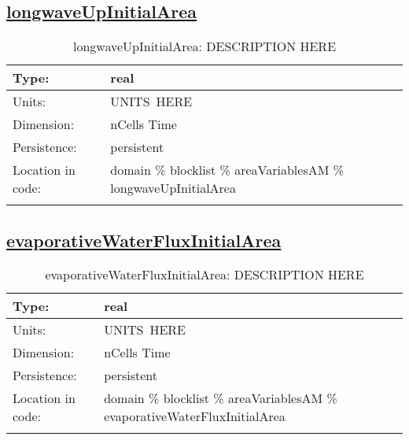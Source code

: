 \subsection[longwaveUpInitialArea]{\hyperref[sec:var_tab_areaVariablesAM]{longwaveUpInitialArea}}
\label{subsec:var_sec_areaVariablesAM_longwaveUpInitialArea}
\begin{center}
\begin{longtable}{| p{2.0in} | p{4.0in} |}
        \hline 
        Type: & real \\
        \hline 
        Units: & \si{UNITS.HERE} \\
        \hline 
        Dimension: & nCells Time \\
        \hline 
        Persistence: & persistent \\
        \hline 
         Location in code: & domain \% blocklist \% areaVariablesAM \% longwaveUpInitialArea \\
         \hline 
    \caption{longwaveUpInitialArea: DESCRIPTION HERE}
\end{longtable}
\end{center}
\subsection[evaporativeWaterFluxInitialArea]{\hyperref[sec:var_tab_areaVariablesAM]{evaporativeWaterFluxInitialArea}}
\label{subsec:var_sec_areaVariablesAM_evaporativeWaterFluxInitialArea}
\begin{center}
\begin{longtable}{| p{2.0in} | p{4.0in} |}
        \hline 
        Type: & real \\
        \hline 
        Units: & \si{UNITS.HERE} \\
        \hline 
        Dimension: & nCells Time \\
        \hline 
        Persistence: & persistent \\
        \hline 
         Location in code: & domain \% blocklist \% areaVariablesAM \% evaporativeWaterFluxInitialArea \\
         \hline 
    \caption{evaporativeWaterFluxInitialArea: DESCRIPTION HERE}
\end{longtable}
\end{center}
